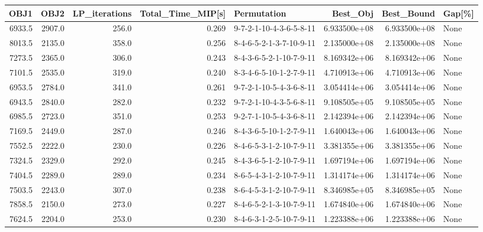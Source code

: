 \begin{tabular}{rrrrlrrl}
\toprule
   OBJ1 &    OBJ2 &  LP\_iterations &  Total\_Time\_MIP[s] &              Permutation &      Best\_Obj &    Best\_Bound & Gap[\%] \\
\midrule
 6933.5 &  2907.0 &          256.0 &              0.269 &  9-7-2-1-10-4-3-6-5-8-11 &  6.933500e+08 &  6.933500e+08 &   None \\
 8013.5 &  2135.0 &          358.0 &              0.256 &  8-4-6-5-2-1-3-7-10-9-11 &  2.135000e+08 &  2.135000e+08 &   None \\
 7273.5 &  2365.0 &          306.0 &              0.243 &  8-4-3-6-5-2-1-10-7-9-11 &  8.169342e+06 &  8.169342e+06 &   None \\
 7101.5 &  2535.0 &          319.0 &              0.240 &  8-3-4-6-5-10-1-2-7-9-11 &  4.710913e+06 &  4.710913e+06 &   None \\
 6953.5 &  2784.0 &          341.0 &              0.261 &  9-7-2-1-10-5-4-3-6-8-11 &  3.054414e+06 &  3.054414e+06 &   None \\
 6943.5 &  2840.0 &          282.0 &              0.232 &  9-7-2-1-10-4-3-5-6-8-11 &  9.108505e+05 &  9.108505e+05 &   None \\
 6985.5 &  2723.0 &          351.0 &              0.253 &  9-2-7-1-10-5-4-3-6-8-11 &  2.142394e+06 &  2.142394e+06 &   None \\
 7169.5 &  2449.0 &          287.0 &              0.246 &  8-4-3-6-5-10-1-2-7-9-11 &  1.640043e+06 &  1.640043e+06 &   None \\
 7552.5 &  2222.0 &          230.0 &              0.226 &  8-4-6-5-3-1-2-10-7-9-11 &  3.381355e+06 &  3.381355e+06 &   None \\
 7324.5 &  2329.0 &          292.0 &              0.245 &  8-4-3-6-5-1-2-10-7-9-11 &  1.697194e+06 &  1.697194e+06 &   None \\
 7404.5 &  2289.0 &          289.0 &              0.234 &  8-6-5-4-3-1-2-10-7-9-11 &  1.314174e+06 &  1.314174e+06 &   None \\
 7503.5 &  2243.0 &          307.0 &              0.238 &  8-6-4-5-3-1-2-10-7-9-11 &  8.346985e+05 &  8.346985e+05 &   None \\
 7858.5 &  2150.0 &          273.0 &              0.227 &  8-4-6-5-2-1-3-10-7-9-11 &  1.674840e+06 &  1.674840e+06 &   None \\
 7624.5 &  2204.0 &          253.0 &              0.230 &  8-4-6-3-1-2-5-10-7-9-11 &  1.223388e+06 &  1.223388e+06 &   None \\
\bottomrule
\end{tabular}
